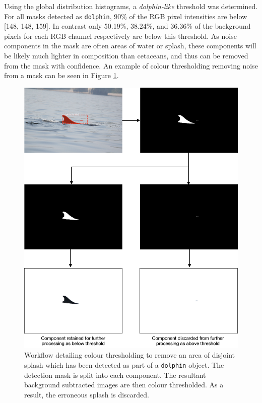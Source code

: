 Using the global distribution histograms, a \textit{dolphin-like} threshold was determined. For all masks detected as \texttt{dolphin}, 90\% of the RGB pixel intensities are below [148, 148, 159]. In contrast only 50.19\%, 38.24\%, and 36.36\% of the background pixels for each RGB channel respectively are below this threshold. As noise components in the mask are often areas of water or splash, these components will be likely much lighter in composition than cetaceans, and thus can be removed from the mask with confidence. An example of colour thresholding removing noise from a mask can be seen in Figure \ref{fig:190827-001-MOLS0078_-colour-thresholding-splash-removed}.

\begin{figure}
	\begin{center}
		\includegraphics[scale=0.5]{Chapter5/figs/190827-001-MOLS0078_-colour-thresholding-splash-removed.png}
	\end{center}
	\caption[Workflow detailing colour thresholding to remove an area of disjoint splash which has been detected as part of a \texttt{dolphin} object.]{Workflow detailing colour thresholding to remove an area of disjoint splash which has been detected as part of a \texttt{dolphin} object. The detection mask is split into each component. The resultant background subtracted images are then colour thresholded. As a result, the erroneous splash is discarded. }\label{fig:190827-001-MOLS0078_-colour-thresholding-splash-removed}
\end{figure}

